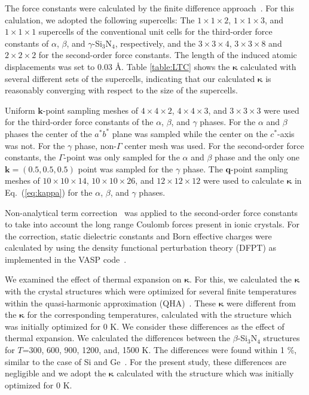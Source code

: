 \documentclass[twocolumn,amsmath,amssymb,a4paper,prb,superscriptaddress,floatfix]{revtex4-1}
\begin{document}
The force constants were calculated by the finite difference
approach~\cite{wei-supercell}. For this calulation, we adopted the following
supercells: The $1\times 1\times2$, $1\times 1\times3$, and $1\times 1\times1$
supercells of the conventional unit cells for the third-order force constants of
$\alpha$, $\beta$, and $\gamma$-Si$_3$N$_4$, respectively, and the $3\times
3\times4$, $3\times 3\times8$ and $2\times 2\times2$ for the second-order force
constants.  The length of the induced atomic displacements was set to 0.03 \AA.
Table \ref{table:LTC} shows the $\boldsymbol{\kappa}$  calculated with several
different sets of the supercells, indicating that our calculated
$\boldsymbol{\kappa}$ is reasonably converging with respect to the size of the
supercells. 

Uniform $\mathbf{k}$-point sampling meshes of $4\times 4\times 2$, $4\times
4\times 3$, and $3\times 3\times 3$ were used for the third-order force
constants of the $\alpha$, $\beta$, and $\gamma$ phases. For the $\alpha$ and
$\beta$ phases the center of the $a^*b^*$ plane was sampled while the center on
the $c^*$-axis was not. For the $\gamma$ phase, non-$\Gamma$ center mesh was
used. For the second-order force constants, the $\Gamma$-point was only sampled
for the $\alpha$ and $\beta$ phase and the only one $\mathbf{k}=(0.5, 0.5, 0.5)$
point was sampled for the $\gamma$ phase. The $\mathbf{q}$-point sampling meshes
of $10\times 10\times 14$, $10\times 10\times 26$, and $12\times 12\times 12$
were used to calculate $\boldsymbol{\kappa}$ in Eq.~(\ref{eq:kappa}) for the
$\alpha$, $\beta$, and $\gamma$ phases.

Non-analytical term correction~\cite{wang} was applied to the second-order force
constants to take into account the long range Coulomb forces present in ionic
crystals. For the correction, static dielectric constants and Born effective
charges were calculated by using the density functional perturbation theory
(DFPT) as implemented in the VASP code~\cite{vasp-lepsiron,lepsiron}.

We examined the effect of thermal expansion on $\boldsymbol{\kappa}$. For this,
we calculated the $\boldsymbol{\kappa}$ with the crystal structures which were
optimized for several finite temperatures within the quasi-harmonic
approximation (QHA)~\cite{dove-p76}. These $\boldsymbol{\kappa}$ were different
from the $\boldsymbol{\kappa}$ for the corresponding temperatures, calculated
with the structure which was initially optimized for 0 K. We consider these
differences as the effect of thermal expansion.  We calculated the differences
between the $\beta$-Si$_3$N$_4$ structures for $T$=300, 600, 900, 1200, and,
1500 K. The differences were found within 1 \%, similar to the case of Si and
Ge~\cite{ward-ltc}. For the present study, these differences are negligible and
we adopt the $\boldsymbol{\kappa}$ calculated with the structure which was
initially optimized for 0 K.
\end{document}
